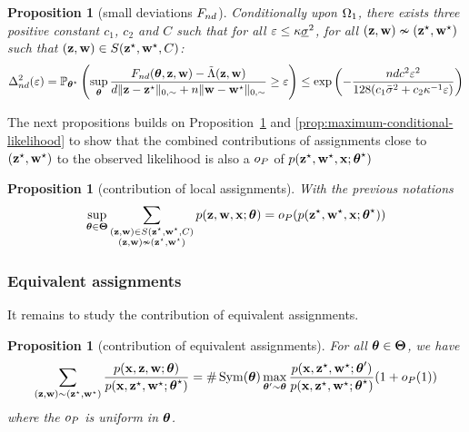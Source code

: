 \documentclass[]{imsart}
\newcommand{\1}{\mathds{1}}
\numberwithin{equation}{section}
\theoremstyle{plain}
\newtheorem{proposition}[thm]{Proposition}
\theoremstyle{remark}
\begin{document}
\begin{proposition}[small deviations $F_{nd}$]
  \label{prop:profile-likelihood-convergence-local}
  Conditionally upon $\Omega_1$, there exists three positive constant $c_1$, $c_2$ and $C$ such that for all $\varepsilon \leq \kappa \underline{\sigma}^2$, for all $(\mathbf{z}, \mathbf{w}) \nsim(\mathbf{z}^\star, \mathbf{w}^\star)$ such that $(\mathbf{z}, \mathbf{w}) \in S(\mathbf{z}^\star, \mathbf{w}^\star, C)$:
  \begin{equation}
    \label{eq:profile-likelihood-convergence-local}
    \begin{aligned}
      \Delta_{\n\dd}^2(\vareps) = \Prob_{\bthetas}\left( \sup_{\btheta} \frac{\Fnd(\btheta, \bz, \bw) - \Lambtilde(\bz, \bw)}{\dd \| \bz - \bzs \|_{0, \sim} + \n \| \bw - \bws \|_{0, \sim}} \geq \vareps \right) \leq \exp \left( - \frac{\n\dd c^2 \vareps^2}{128(c_1 \vmax^2 + c_2 \neighborsize^{-1} \vareps)}\right)
    \end{aligned}
  \end{equation}
\end{proposition}

The next propositions builds on Proposition~\ref{prop:profile-likelihood-convergence-local} and \ref{prop:maximum-conditional-likelihood} to show that the combined contributions of assignments close to $(\mathbf{z}^\star, \mathbf{w}^\star)$ to the observed likelihood is also a $o_P$ of  $p(\mathbf{z}^\star, \mathbf{w}^\star, \mathbf{x}; \boldsymbol{\theta}^\star)$

\begin{proposition}[contribution of local assignments]
  \label{prop:small-deviations-profile-likelihood}
  With the previous notations
  \begin{equation*}
    \sup_{\btheta \in \bTheta} \sum_{\substack{(\bz, \bw) \in S(\bzs, \bws, C) \\ (\bz, \bw) \nsim (\bzs, \bws)}} \prob(\bz, \bw, \bx; \btheta) = \smallO_P( \prob(\bzs, \bws, \bx; \bthetas) )
  \end{equation*}
\end{proposition}


\subsubsection{Equivalent assignments}
It remains to study the contribution of equivalent assignments.
\begin{proposition}[contribution of equivalent assignments]
  \label{prop:equivalent-configurations-profile-likelihood}
  For all $\boldsymbol{\theta} \in \boldsymbol{\Theta}$, we have 
  \begin{equation*}
    \sum_{(\bz, \bw) \sim (\bzs, \bws)} \frac{\prob(\bx, \bz, \bw; \btheta)}{\prob(\bx, \bzs, \bws; \bthetas)} = \# \Symmetric(\btheta) \max_{\btheta' \sim \btheta} \frac{\prob(\bx, \bzs, \bws; \btheta')}{\prob(\bx, \bzs, \bws; \bthetas)} (1 + \smallO_P(1))
  \end{equation*}   
  where the $o_P$ is uniform in $\boldsymbol{\theta}$. 
\end{proposition}
\end{document}
